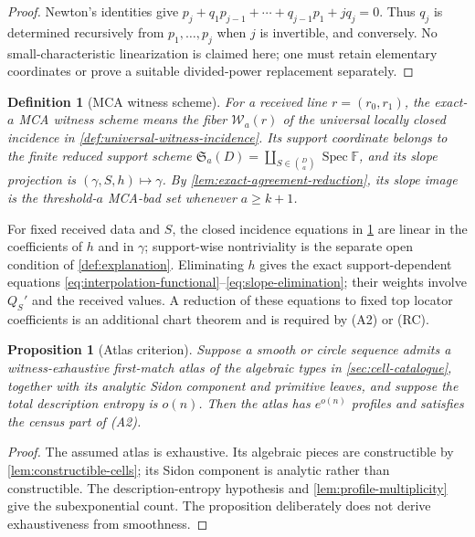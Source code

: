 \documentclass[12pt,a4paper]{amsart}
\numberwithin{equation}{section}
\newtheorem{proposition}[proposition]{Proposition}
\newtheorem{definition}[definition]{Definition}
\theoremstyle{remark}
\DeclareMathOperator{\Spec}{Spec}
\newcommand{\F}{\mathbb F}
\newcommand{\Wcal}{\mathcal W}
\begin{document}
\begin{proof}
Newton's identities give \(p_j+q_1p_{j-1}+\cdots+q_{j-1}p_1+jq_j=0\).
Thus \(q_j\) is determined recursively from \(p_1,\ldots,p_j\) when
\(j\) is invertible, and conversely.  No small-characteristic
linearization is claimed here; one must retain elementary coordinates or
prove a suitable divided-power replacement separately.
\end{proof}

\begin{definition}[MCA witness scheme]\label{def:mca-witness-scheme}
For a received line \(r=(r_0,r_1)\), the exact-\(a\) MCA witness scheme
means the fiber \(\Wcal_a(r)\) of the universal locally closed incidence
in \cref{def:universal-witness-incidence}.  Its support coordinate belongs
to the finite reduced support scheme
\(\mathfrak S_a(D)=\coprod_{S\in\binom Da}\Spec\F\), and its slope
projection is \((\gamma,S,h)\mapsto\gamma\).  By
\cref{lem:exact-agreement-reduction}, its slope image is the
threshold-\(a\) MCA-bad set whenever \(a\ge k+1\).
\end{definition}

For fixed received data and \(S\), the closed incidence equations in
\cref{def:mca-witness-scheme} are linear in the coefficients of \(h\) and
in \(\gamma\); support-wise nontriviality is the separate open condition
of \cref{def:explanation}.  Eliminating
\(h\) gives the exact support-dependent equations
\eqref{eq:interpolation-functional}--\eqref{eq:slope-elimination}; their
weights involve \(Q_S'\) and the received values.  A reduction of these
equations to fixed top locator coefficients is an additional chart theorem
and is required by \textup{(A2)} or \textup{(RC)}.

\begin{proposition}[Atlas criterion]\label{prop:first-match-atlas-finite}
Suppose a smooth or circle sequence admits a witness-exhaustive
first-match atlas
of the algebraic types in \cref{sec:cell-catalogue}, together with its
analytic Sidon component and primitive leaves, and suppose the total
description entropy is \(o(n)\).  Then the atlas has \(e^{o(n)}\) profiles
and satisfies the census part of \textup{(A2)}.
\end{proposition}

\begin{proof}
The assumed atlas is exhaustive.  Its algebraic pieces are constructible by
\cref{lem:constructible-cells}; its Sidon component is analytic rather than
constructible.  The description-entropy hypothesis and
\cref{lem:profile-multiplicity} give the subexponential count.  The
proposition deliberately does not derive exhaustiveness from smoothness.
\end{proof}
\end{document}
